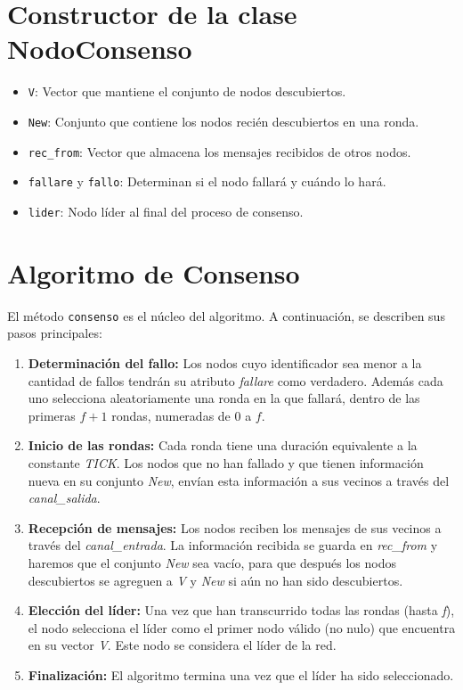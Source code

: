 

\section{Constructor de la clase NodoConsenso}


\begin{itemize}
	\item \texttt{V}: Vector que mantiene el conjunto de nodos descubiertos.
	\item \texttt{New}: Conjunto que contiene los nodos recién descubiertos en una ronda.
	\item \texttt{rec\_from}: Vector que almacena los mensajes recibidos de otros nodos.
	\item \texttt{fallare} y \texttt{fallo}: Determinan si el nodo fallará y cuándo lo hará.
	\item \texttt{lider}: Nodo líder al final del proceso de consenso.
\end{itemize}

\section{Algoritmo de Consenso}

El método \texttt{consenso} es el núcleo del algoritmo. A continuación, se describen sus pasos principales:

\begin{enumerate}
	\item \textbf{Determinación del fallo:} Los nodos cuyo identificador sea menor a la cantidad de fallos tendrán su atributo \textit{fallare} como verdadero. Además cada uno selecciona aleatoriamente una ronda en la que fallará, dentro de las primeras \(f+1\) rondas, numeradas de \(0\) a \(f\).
	
	\item \textbf{Inicio de las rondas:} Cada ronda tiene una duración equivalente a la constante \textit{TICK}. Los nodos que no han fallado y que tienen información nueva en su conjunto \textit{New}, envían esta información a sus vecinos a través del \textit{canal\_salida}.
	
	\item \textbf{Recepción de mensajes:} Los nodos reciben los mensajes de sus vecinos a través del \textit{canal\_entrada}. La información recibida se guarda en \textit{rec\_from} y haremos que el conjunto \textit{New} sea vacío, para que después los nodos descubiertos se agreguen a \textit{V} y \textit{New} si aún no han sido descubiertos.
	
	\item \textbf{Elección del líder:} Una vez que han transcurrido todas las rondas (hasta \textit{f}), el nodo selecciona el líder como el primer nodo válido (no nulo) que encuentra en su vector \textit{V}. Este nodo se considera el líder de la red.

	
	\item \textbf{Finalización:} El algoritmo termina una vez que el líder ha sido seleccionado.
\end{enumerate}


